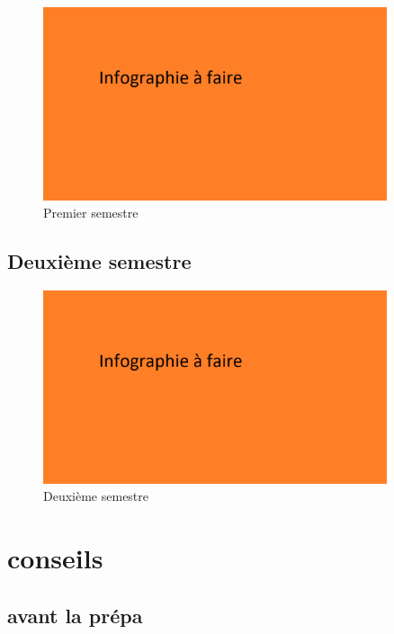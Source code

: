 \documentclass[aspectratio=169]{beamer}
\begin{document}
\begin{frame}
    \begin{figure}
        \centering
        \includegraphics[width=0.9\textwidth]{ressource_diapo/place older.png}
        \caption{Premier semestre}
    \end{figure}
\end{frame}

\subsection{Deuxième semestre}

\begin{frame}
    \begin{figure}
        \centering
        \includegraphics[width=0.9\textwidth]{ressource_diapo/place older.png}
        \caption{Deuxième semestre}
    \end{figure}
\end{frame}

\section{conseils}

\subsection{avant la prépa}
\end{document}
